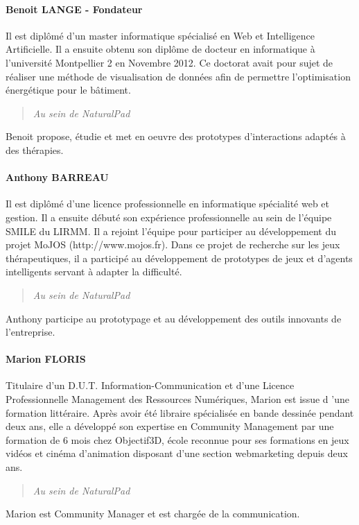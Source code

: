 		\paragraph{Benoit LANGE - Fondateur\\}
Il est diplômé d’un master informatique spécialisé en Web et Intelligence Artificielle. Il a ensuite obtenu son diplôme de docteur en informatique à l’université Montpellier 2 en Novembre 2012. Ce doctorat avait pour sujet de réaliser une méthode de visualisation de données afin de permettre l’optimisation énergétique pour le bâtiment. 
		\begin{quotation} \emph{Au sein de NaturalPad} \end{quotation}
Benoit propose, étudie et met en oeuvre des prototypes d’interactions adaptés à des thérapies.

		\paragraph{Anthony BARREAU\\}
Il est diplômé d’une licence professionnelle en informatique spécialité web et gestion. Il a ensuite débuté son expérience professionnelle au sein de l’équipe SMILE du LIRMM. Il a rejoint l’équipe pour participer au développement du projet MoJOS (http://www.mojos.fr). Dans ce projet de recherche sur les jeux thérapeutiques, il a participé au développement de prototypes de jeux et d’agents intelligents servant à adapter la difficulté. 
		\begin{quotation} \emph{Au sein de NaturalPad} \end{quotation}
Anthony participe au prototypage et au développement des outils innovants de l’entreprise.

		\paragraph{Marion FLORIS\\}
Titulaire d’un D.U.T. Information-Communication et d’une Licence Professionnelle Management des Ressources Numériques, Marion est issue d ’une formation littéraire. Après avoir été libraire spécialisée en bande dessinée pendant deux ans, elle a développé son expertise en Community Management par une formation de 6 mois chez Objectif3D, école reconnue pour ses formations en jeux vidéos et cinéma d’animation disposant d’une section webmarketing depuis deux ans.
		\begin{quotation} \emph{Au sein de NaturalPad} \end{quotation}
Marion est Community Manager et est chargée de la communication.

